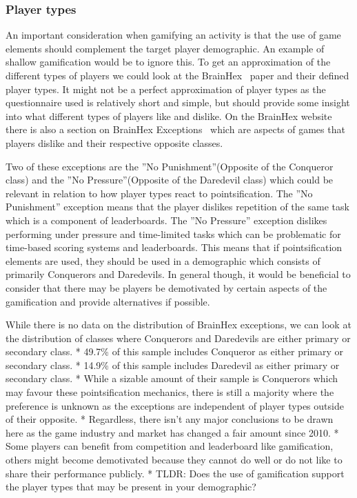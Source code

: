 \subsubsection{Player types}
An important consideration when gamifying an activity is that the use of game elements should complement the target player demographic. An example of shallow gamification would be to ignore this. To get an approximation of the different types of players we could look at the BrainHex~\cite{nacke2014brainhex} paper and their defined player types. It might not be a perfect approximation of player types as the questionnaire used is relatively short and simple, but should provide some insight into what different types of players like and dislike. On the BrainHex website there is also a section on BrainHex Exceptions~\cite{brainhexexceptions} which are aspects of games that players dislike and their respective opposite classes. 

Two of these exceptions are the ''No Punishment''(Opposite of the Conqueror class) and the ''No Pressure''(Opposite of the Daredevil class) which could be relevant in relation to how player types react to pointsification. The ''No Punishment'' exception means that the player dislikes repetition of the same task which is a component of leaderboards. The ''No Pressure'' exception dislikes performing under pressure and time-limited tasks which can be problematic for time-based scoring systems and leaderboards. This means that if pointsification elements are used, they should be used in a demographic which consists of primarily Conquerors and Daredevils. In general though, it would be beneficial to consider that there may be players be demotivated by certain aspects of the gamification and provide alternatives if possible. 

While there is no data on the distribution of BrainHex exceptions, we can look at the distribution of classes where Conquerors and Daredevils are either primary or secondary class. 
            * 49.7\% of this sample includes Conqueror as either primary or secondary class.  
            * 14.9\% of this sample includes Daredevil as either primary or secondary class. 
            * While a sizable amount of their sample is Conquerors which may favour these pointsification mechanics, there is still a majority where the preference is unknown as the exceptions are independent of player types outside of their opposite. 
        * Regardless, there isn't any major conclusions to be drawn here as the game industry and market has changed a fair amount since 2010.
    * Some players can benefit from competition and leaderboard like gamification, others might become demotivated because they cannot do well or do not like to share their performance publicly. 
    * TLDR: Does the use of gamification support the player types that may be present in your demographic?
\fi


